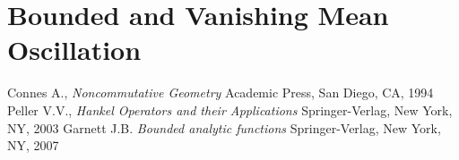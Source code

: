 \documentclass{unswmaths}
\begin{document}
\section*{Bounded and Vanishing Mean Oscillation}
\label{BMOandVMO}

\begin{thebibliography}{9}
     Connes A., 
    \emph{Noncommutative Geometry}
     Academic Press, 
     San Diego, 
     CA, 
     1994
    Peller V.V.,
    \emph{Hankel Operators and their Applications}
    Springer-Verlag,
    New York, 
    NY,
    2003    
    Garnett J.B.
    \emph{Bounded analytic functions}
    Springer-Verlag,
    New York,
    NY,
    2007    
\end{thebibliography}
\end{document}
